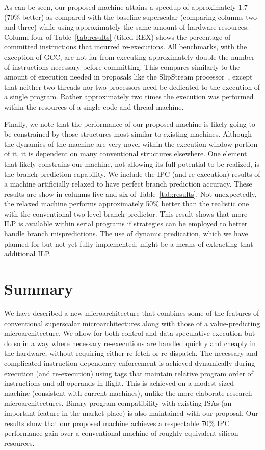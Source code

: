 \documentclass[10pt,dvips]{article}
\begin{document}
%
As can be seen, our proposed machine attains a speedup of approximately
1.7 (70\% better) as compared with the baseline superscalar 
(comparing columns two and three) 
while using approximately the same amount of hardware resources.
Column four of Table~\ref{tab:results} (titled REX) shows the percentage
of committed instructions that incurred re-executions.
All benchmarks, with the exception of GCC, are not far
from executing approximately double the number of instructions
necessary before committing.
This compares similarly to the amount of execution needed
in proposals like the SlipStream processor~\cite{ibrahim03},
except that neither two threads nor two processors need be
dedicated to the execution of a single program. 
Rather approximately two times the execution was performed
within the resources of a single code and thread machine.

Finally, we note that the performance of our proposed machine
is likely going to be constrained by those structures most
similar to existing machines.  Although the dynamics of
the machine are very novel within the execution window portion of
it, it is dependent on many conventional structures elsewhere.
One element that likely constrains our machine, not allowing its
full potential to be realized, is the branch prediction
capability.  We include the IPC (and re-execution) results of a
machine artificially relaxed to have perfect branch prediction
accuracy.  These results are show in columns five and six of
Table~\ref{tab:results}.  Not unexpectedly, the relaxed machine performs
approximately 50\% better than the realistic one with the
conventional two-level branch predictor.
This result shows that more ILP is available within serial programs
if strategies can be employed to better handle branch mispredictions.
The use of dynamic predication, which we have planned for but not
yet fully implemented, might be a means of extracting that additional
ILP.
%
%
\vspace{-0.15in}
\section{Summary}
%
We have described a new microarchitecture that combines
some of the features of conventional superscalar microarchitectures
along with those of a value-predicting microarchitecture.
We allow for both control and data speculative execution
but do so in a way where necessary re-executions are handled
quickly and cheaply in the hardware, without requiring either
re-fetch or re-dispatch.  
The necessary and complicated instruction dependency
enforcement is achieved dynamically during execution (and re-execution)
using tags that maintain relative program order
of instructions and all operands in flight.
This is achieved on a modest sized machine (consistent with current
machines), unlike the more
elaborate research microarchitectures.
Binary program compatibility with existing ISAs (an important feature
in the market place) is also maintained with our proposal.
Our results show that our proposed machine achieves a respectable
70\% IPC performance gain over a conventional machine of roughly
equivalent silicon resources.
\end{document}
